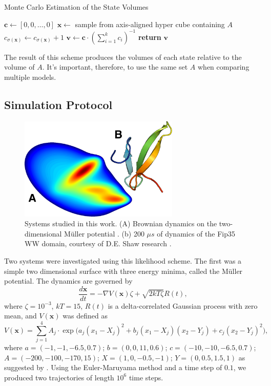 \documentclass[journal=jpcbfk, layout=traditional, manuscript=article]{achemso}
\begin{document}
\begin{algorithm}
\caption{Monte Carlo Estimation of the State Volumes}
\label{alg:volumes}
\begin{algorithmic}[1]
	\State $\mathbf{c} \gets [0, 0, \ldots, 0]$
		\State $\mathbf{x} \gets $ sample from axis-aligned hyper cube containing $A$
			\State $c_{\sigma(\mathbf{x})} \gets c_{\sigma(\mathbf{x})} + 1$
		\EndIf
	\EndWhile
	\State $\mathbf{v} \gets \mathbf{c} \cdot(\sum_{i=1}^k c_i)^{-1}$ 
	\State \textbf{return} $\mathbf{v}$
\EndProcedure
\end{algorithmic}
\end{algorithm} \noindent The result of this scheme produces the volumes of each state relative to the volume of $A$. It's important, therefore, to use the same set $A$ when comparing multiple models.
\subsection{Simulation Protocol}

\begin{figure}
\centering
\includegraphics[width=3in]{figs_final/mull_ww.png}
\caption{Systems studied in this work. (A) Brownian dynamics on the two-dimensional M\"{u}ller potential \cite{Muller1979Location}. (b) 200 $\mu s$ of dynamics of the Fip35 WW domain\cite{Liu2008Experimental}, courtesy of D.E. Shaw research \cite{Shaw2010Atomic}.}
\label{fig:pics}
\end{figure} 

Two systems were investigated using this likelihood scheme. The first was a simple two dimensional surface with three energy minima, called the M\"{u}ller potential. The dynamics are governed by
$$
\frac{d\mathbf{x}}{dt} = - \nabla V(\mathbf{x})\zeta + \sqrt{2kT\zeta} R(t),
$$ where $\zeta = 10^{-3}$, $kT = 15$, $R(t)$ is a delta-correlated Gaussian process with zero mean, and $V(\mathbf{x})$ was defined as
$$
V(\mathbf{x}) =  \sum_{j=1}^4 A_j \cdot \exp\Big(a_j (x_1-X_j)^2+b_j(x_1-X_j)(x_2-Y_j)+c_j(x_2-Y_j)^2\Big),
$$ where $a = (-1, -1, -6.5, 0.7)$; $b = (0, 0, 11, 0.6)$; $c = (-10, -10, -6.5, 0.7)$; $A = (-200, -100, -170, 15)$; $X = (1, 0, -0.5, -1)$; $Y = (0, 0.5, 1.5, 1)$ as suggested by \citet{Muller1979Location}. Using the Euler-Maruyama method and a time step of $0.1$, we produced two trajectories of length $10^6$ time steps.
\end{document}
